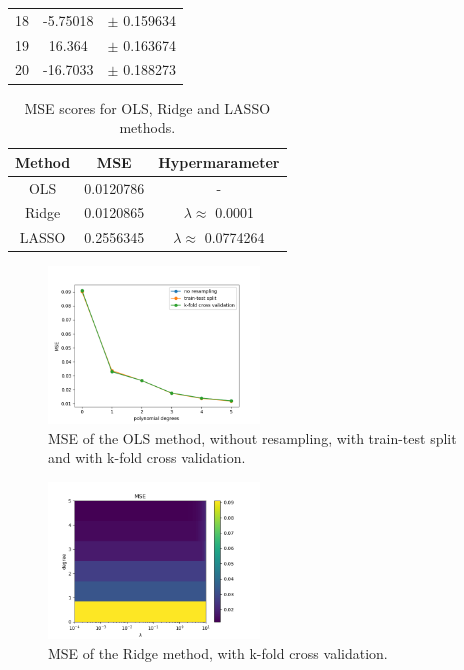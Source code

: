 \documentclass[reprint,english,notitlepage]{revtex4-1}  %
\begin{document}
\begin{table}[h]
\begin{tabular}{|c|c|c|}
                            18 & -5.75018 & $\pm$  0.159634\\                                                                                         19 &   16.364 & $\pm$  0.163674\\                                                                                         20 & -16.7033 & $\pm$  0.188273\\  
\hline
\end{tabular}
\end{table}


\begin{table}[h]  %
\caption{MSE scores for OLS, Ridge and LASSO methods.}\label{table_mse}
\begin{tabular}{|c|c|c|} %
\hline                    %
Method & MSE & Hypermarameter  \\
\hline
OLS &    0.0120786 & -\\                                                                                        Ridge &  0.0120865 & $\lambda \approx$ 0.0001\\                                               
LASSO &  0.2556345 & $\lambda \approx$ 0.0774264\\ 
 \hline
\end{tabular}
\end{table}

\begin{figure}[h]
    \centering
    \includegraphics[width=0.50\textwidth]{OLS_mse.png}
    \caption{MSE of the OLS method, without resampling, with train-test split and with k-fold cross validation.}
    \label{ols: mse}
\end{figure}


\begin{figure}[h]
    \centering
    \includegraphics[width=0.50\textwidth]{RIDGE_mse.png}
    \caption{MSE of the Ridge method, with k-fold cross validation.}
    \label{ridge: mse_map}
\end{figure}
\end{document}

